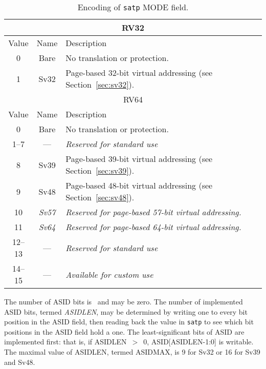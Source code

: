 \begin{table}[h]
\begin{center}
\begin{tabular}{|c|c|l|}
\hline
\multicolumn{3}{|c|}{RV32} \\
\hline
Value  & Name & Description \\
\hline
0       & Bare  & No translation or protection. \\
1       & Sv32  & Page-based 32-bit virtual addressing (see Section~\ref{sec:sv32}). \\
\hline \hline
\multicolumn{3}{|c|}{RV64} \\
\hline
Value  & Name & Description \\
\hline  
0       & Bare  & No translation or protection. \\
1--7    & ---   & {\em Reserved for standard use} \\
8       & Sv39  & Page-based 39-bit virtual addressing (see Section~\ref{sec:sv39}). \\
9       & Sv48  & Page-based 48-bit virtual addressing (see Section~\ref{sec:sv48}). \\
10      & {\em Sv57} & {\em Reserved for page-based 57-bit virtual addressing.} \\
11      & {\em Sv64} & {\em Reserved for page-based 64-bit virtual addressing.} \\
12--13  & ---   & {\em Reserved for standard use} \\
14--15  & ---   & {\em Available for custom use} \\
\hline
\end{tabular}
\end{center}
\caption{Encoding of {\tt satp} MODE field.}
\label{tab:satp-mode}
\end{table}

The number of ASID bits is \unspecified\ and may be zero.  The
number of implemented ASID bits, termed {\mbox {\em ASIDLEN}}, may be
determined by writing one to every bit position in the ASID field, then
reading back the value in {\tt satp} to see which bit positions in the ASID
field hold a one.  The least-significant bits of ASID are implemented first:
that is, if ASIDLEN~$>$~0, ASID[ASIDLEN-1:0] is writable.  The maximal value
of ASIDLEN, termed ASIDMAX, is 9 for Sv32 or 16 for Sv39 and Sv48.

